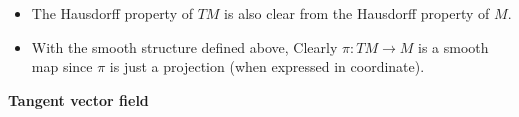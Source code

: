 \begin{enumerate}[(1)]
\begin{itemize}
\begin{align*}
                \left(x^1_\alpha,\ldots,x^n_\alpha\right);
                \sum_{i=1}^n V^i_\alpha 
                \pdv{y^1_\beta}{x^i_\alpha},
                \cdots,
                \sum_{i=1}^n V^i_\alpha 
                \pdv{y^n_\beta}{x^i_\alpha}
            \right)
        .\end{align*}
        Hence, \(\widetilde{\varphi}_\beta\circ 
        \widetilde{\varphi}_\alpha^{-1}\) is smooth since 
        \(\varphi_\beta\circ \varphi_\alpha^{-1}\)
        is smooth, and the transition function on the vector part 
        is just linear.
        \item The Hausdorff property of \(TM\) is also clear from 
        the Hausdorff property of \(M\).
        \item With the smooth structure defined above, Clearly
        \(\pi\colon TM\to M\) is a smooth map since \(\pi\) is
        just a projection (when expressed in coordinate).
    \end{itemize}
\end{enumerate}
    \textbf{Tangent vector field}
        
